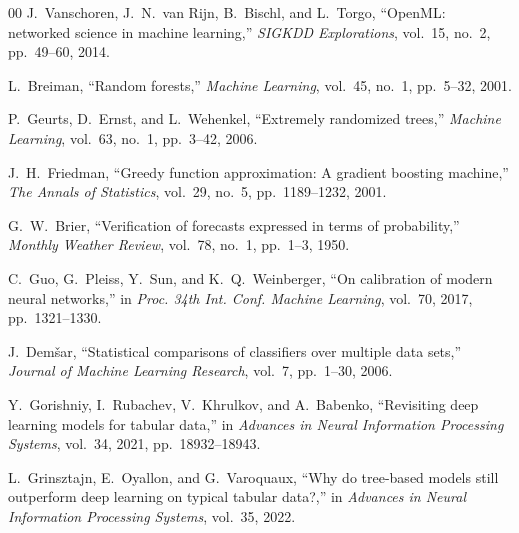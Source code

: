 \documentclass{ieeeaccess}
\begin{document}
\begin{thebibliography}{00}
J.~Vanschoren, J.~N.~van Rijn, B.~Bischl, and L.~Torgo, ``OpenML: networked science in machine learning,'' \emph{SIGKDD Explorations}, vol.~15, no.~2, pp.~49--60, 2014.

L.~Breiman, ``Random forests,'' \emph{Machine Learning}, vol.~45, no.~1, pp.~5--32, 2001.

P.~Geurts, D.~Ernst, and L.~Wehenkel, ``Extremely randomized trees,'' \emph{Machine Learning}, vol.~63, no.~1, pp.~3--42, 2006.

J.~H.~Friedman, ``Greedy function approximation: A gradient boosting machine,'' \emph{The Annals of Statistics}, vol.~29, no.~5, pp.~1189--1232, 2001.

G.~W.~Brier, ``Verification of forecasts expressed in terms of probability,'' \emph{Monthly Weather Review}, vol.~78, no.~1, pp.~1--3, 1950.

C.~Guo, G.~Pleiss, Y.~Sun, and K.~Q.~Weinberger, ``On calibration of modern neural networks,'' in \emph{Proc. 34th Int. Conf. Machine Learning}, vol.~70, 2017, pp.~1321--1330.

J.~Dem\v{s}ar, ``Statistical comparisons of classifiers over multiple data sets,'' \emph{Journal of Machine Learning Research}, vol.~7, pp.~1--30, 2006.

Y.~Gorishniy, I.~Rubachev, V.~Khrulkov, and A.~Babenko, ``Revisiting deep learning models for tabular data,'' in \emph{Advances in Neural Information Processing Systems}, vol.~34, 2021, pp.~18932--18943.

L.~Grinsztajn, E.~Oyallon, and G.~Varoquaux, ``Why do tree-based models still outperform deep learning on typical tabular data?,'' in \emph{Advances in Neural Information Processing Systems}, vol.~35, 2022.
\end{thebibliography}

\EOD
\end{document}
